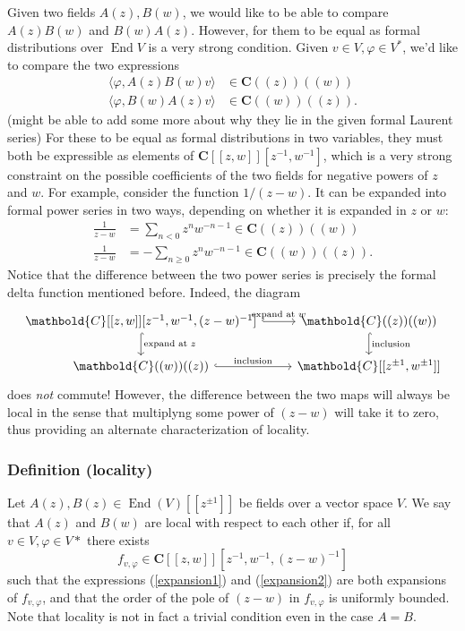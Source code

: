 \documentclass{article}
\newcommand{\CC}{\mathbold{C}}
\DeclareMathOperator{\End}{End}
\begin{document}
Given two fields $A(z),B(w)$, we would like to be able to compare $A(z)B(w)$ and $B(w)A(z)$.  However, for them to be equal as formal distributions over $\End V$ is a very strong condition.  Given $v \in V, \varphi \in V^*$, we'd like to compare the two expressions
\begin{align}
  \langle \varphi, A(z)B(w) v \rangle &\in \CC((z))((w)) \label{expansion1}\\
  \langle \varphi, B(w)A(z) v \rangle &\in \CC((w))((z)). \label{expansion2}
\end{align}
(might be able to add some more about why they lie in the given formal Laurent series)
For these to be equal as formal distributions in two variables, they must both be expressible as elements of $\CC[[z,w]][z^{-1},w^{-1}]$, which is a very strong constraint on the possible coefficients of the two fields for negative powers of $z$ and $w$.  For example, consider the function $1/(z-w)$.  It can be expanded into formal power series in two ways, depending on whether it is expanded in $z$ or $w$:
\begin{align}
  \frac{1}{z-w}&=\sum_{n<0}z^nw^{-n-1} \in \CC((z))((w))\\
  \frac{1}{z-w}&=-\sum_{n \ge 0}z^nw^{-n-1} \in \CC((w))((z)).
\end{align}
Notice that the difference between the two power series is precisely the formal delta function mentioned before.  Indeed, the diagram
\[
  \begin{tikzcd}
    \CC[[z,w]][z^{-1},w^{-1},(z-w)^{-1}] \arrow[r,hook,"\textrm{expand at }w"] \arrow[d,hook,"\textrm{expand at }z"] & \CC((z))((w)) \arrow[d,hook,"\textrm{inclusion}"]\\
    \CC((w))((z))\arrow[r,hook,"\textrm{inclusion}"]& \CC[[z^{\pm 1},w^{\pm 1}]]
  \end{tikzcd}
\]
does \textit{not} commute!  However, the difference between the two maps will always be local in the sense that multiplyng some power of $(z-w)$ will take it to zero, thus providing an alternate characterization of locality.
\subsubsection{Definition (locality)}
Let $A(z),B(z) \in \End (V)[[z^{\pm 1}]]$ be fields over a vector space $V$.  We say that $A(z)$ and $B(w)$ are local with respect to each other if, for all $v \in V, \varphi \in V*$ there exists
\[f_{v,\varphi} \in \CC[[z,w]][z^{-1},w^{-1},(z-w)^{-1}] \]
such that the expressions (\ref{expansion1}) and (\ref{expansion2}) are both expansions of $f_{v,\varphi}$, and that the order of the pole of $(z-w)$ in $f_{v,\varphi}$ is uniformly bounded.
Note that locality is not in fact a trivial condition even in the case $A=B$.
\end{document}
